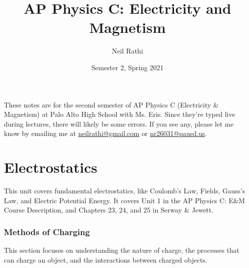 \documentclass[11pt]{article}
\title{AP Physics C: Electricity and Magnetism}
\author{Neil Rathi}
\date{Semester 2, Spring 2021}
\begin{document}
\thispagestyle{empty}

\maketitle

\noindent These notes are for the second semester of AP Physics C (Electricity \& Magnetism) at Palo Alto High School with Ms. Eris. Since they're typed live during lectures, there will likely be some errors. If you see any, please let me know by emailing me at \href{mailto:neilrathi@gmail.com}{neilrathi@gmail.com} or \href{mailto:neilrathi@gmail.com}{nr26031@pausd.us}.

\setcounter{tocdepth}{1}
\tableofcontents
\newpage

\part{Electrostatics}
This unit covers fundamental electrostatics, like Coulomb's Law, Fields, Gauss's Law, and Electric Potential Energy. It covers Unit 1 in the AP Physics C: E\&M Course Description, and Chapters 23, 24, and 25 in Serway \& Jewett.

\section{Methods of Charging}
This section focuses on understanding the nature of charge, the processes that can charge an object, and the interactions between charged objects.
\end{document}
